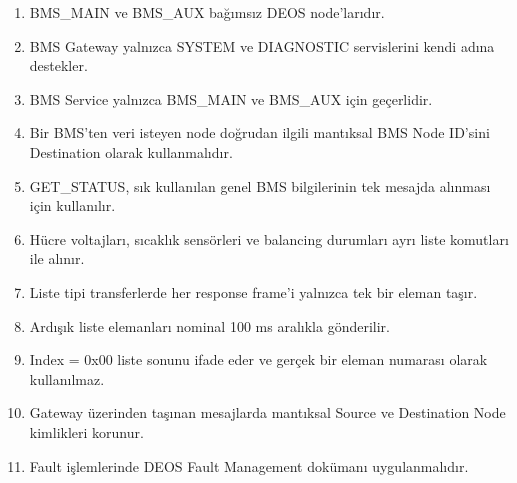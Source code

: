 \documentclass[a4paper,10pt]{article}
\begin{document}
\begin{enumerate}

    \item BMS\_MAIN ve BMS\_AUX bağımsız DEOS node'larıdır.

    \item BMS Gateway yalnızca SYSTEM ve DIAGNOSTIC servislerini
    kendi adına destekler.

    \item BMS Service yalnızca BMS\_MAIN ve BMS\_AUX için geçerlidir.

    \item Bir BMS'ten veri isteyen node doğrudan ilgili mantıksal
    BMS Node ID'sini Destination olarak kullanmalıdır.

    \item GET\_STATUS, sık kullanılan genel BMS bilgilerinin tek
    mesajda alınması için kullanılır.

    \item Hücre voltajları, sıcaklık sensörleri ve balancing durumları
    ayrı liste komutları ile alınır.

    \item Liste tipi transferlerde her response frame'i yalnızca
    tek bir eleman taşır.

    \item Ardışık liste elemanları nominal 100 ms aralıkla gönderilir.

    \item Index = 0x00 liste sonunu ifade eder ve gerçek bir eleman
    numarası olarak kullanılmaz.

    \item Gateway üzerinden taşınan mesajlarda mantıksal Source ve
    Destination Node kimlikleri korunur.

    \item Fault işlemlerinde DEOS Fault Management dokümanı
    uygulanmalıdır.

\end{enumerate}
\end{document}
